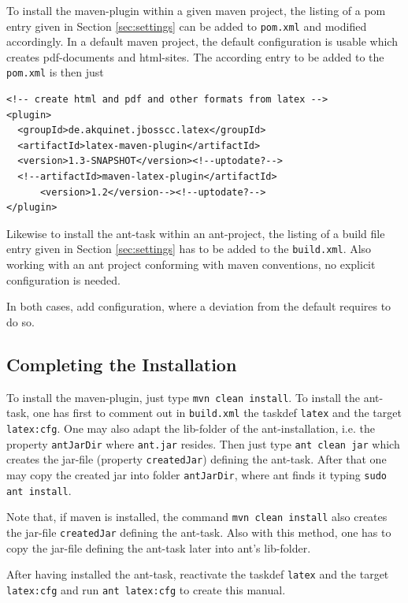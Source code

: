 \documentclass[12pt]{article}
\begin{document}
To install the maven-plugin within a given maven project, 
the listing of a pom entry given in Section \ref{sec:settings} 
can be added to {\tt pom.xml} and modified accordingly. 
In a default maven project, 
the default configuration is usable which creates pdf-documents and
html-sites. 
The according entry to be added to the {\tt pom.xml} is then just 
%
\lstset{language=xml, basicstyle=\small}
\begin{lstlisting}
<!-- create html and pdf and other formats from latex -->
<plugin>
  <groupId>de.akquinet.jbosscc.latex</groupId>
  <artifactId>latex-maven-plugin</artifactId>
  <version>1.3-SNAPSHOT</version><!--uptodate?-->
  <!--artifactId>maven-latex-plugin</artifactId>
      <version>1.2</version--><!--uptodate?-->
</plugin>
\end{lstlisting}

Likewise to install the ant-task within an ant-project, 
the listing of a build file entry given in Section \ref{sec:settings} 
has to be added to the {\tt build.xml}. 
Also working with an ant project 
conforming with maven conventions, 
no explicit configuration is needed. 

In both cases, add configuration, 
where a deviation from the default requires to do so. 



\subsection{Completing the Installation}\label{subsec:instComplete}

To install the maven-plugin, just type {\tt mvn clean install}. 
To install the ant-task, one has first to comment out in {\tt build.xml} 
the taskdef {\tt latex} and the target {\tt latex:cfg}. 
One may also adapt the lib-folder of the ant-installation, 
i.e. the property {\tt antJarDir} where {\tt ant.jar} resides. 
Then just type {\tt ant clean jar} 
which creates the jar-file (property {\tt createdJar}) defining the ant-task. 
After that one may copy the created jar into folder {\tt antJarDir}, 
where ant finds it typing {\tt sudo ant install}. 

Note that, if maven is installed, the command {\tt mvn clean install} 
also creates the jar-file {\tt createdJar} defining the ant-task. 
Also with this method, one has to copy the jar-file defining the ant-task 
later into ant's lib-folder. 

After having installed the ant-task, 
reactivate the taskdef {\tt latex} and the target {\tt latex:cfg} 
and run {\tt ant latex:cfg} to create this manual. 
\end{document}
